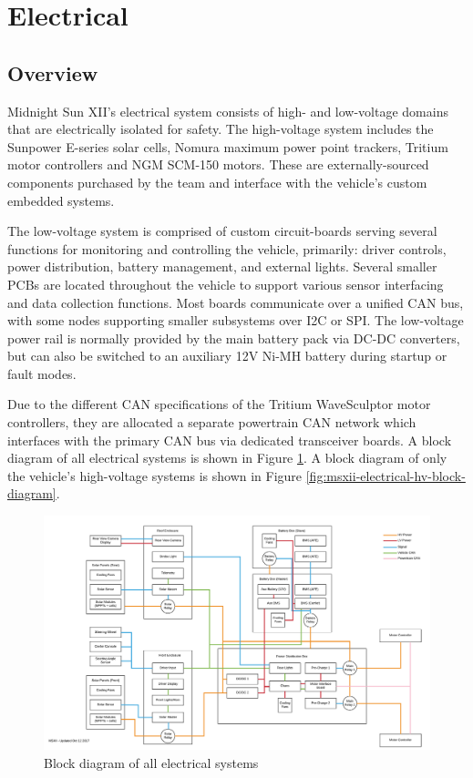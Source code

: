 \documentclass[10pt]{article}
\begin{document}
\clearpage
\section{Electrical}
\subsection{Overview}
Midnight Sun XII's electrical system consists of high- and low-voltage domains that are electrically isolated for safety. The high-voltage system includes the Sunpower E-series solar cells, Nomura maximum power point trackers, Tritium motor controllers and NGM SCM-150 motors. These are externally-sourced components purchased by the team and interface with the vehicle's custom embedded systems.

The low-voltage system is comprised of custom circuit-boards serving several functions for monitoring and controlling the vehicle, primarily: driver controls, power distribution, battery management, and external lights. Several smaller PCBs are located throughout the vehicle to support various sensor interfacing and data collection functions. Most boards communicate over a unified CAN bus, with some nodes supporting smaller subsystems over I2C or SPI. The low-voltage power rail is normally provided by the main battery pack via DC-DC converters, but can also be switched to an auxiliary 12V Ni-MH battery during startup or fault modes.

Due to the different CAN specifications of the Tritium WaveSculptor motor controllers, they are allocated a separate powertrain CAN network which interfaces with the primary CAN bus via dedicated transceiver boards. A block diagram of all electrical systems is shown in Figure \ref{fig:msxii-electrical-full-block-diagram}. A block diagram of only the vehicle's high-voltage systems is shown in Figure \ref{fig:msxii-electrical-hv-block-diagram}.

\begin{figure}
\centering
\includegraphics[width=\textwidth]{figures/msxii-electrical-full-block-diagram}
\caption{Block diagram of all electrical systems}
\label{fig:msxii-electrical-full-block-diagram}
\end{figure}
\end{document}
